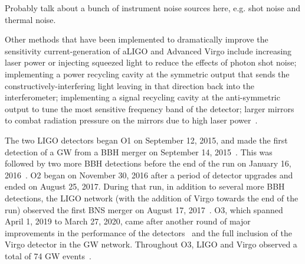 {\color{red}Probably talk about a bunch of instrument noise sources here, e.g. shot noise and thermal noise.}

Other methods that have been implemented to dramatically improve the sensitivity current-generation of \ac{aLIGO} and Advanced Virgo include increasing laser power or injecting squeezed light to reduce the effects of photon shot noise; implementing a power recycling cavity at the symmetric output that sends the constructively-interfering light leaving in that direction back into the interferometer; implementing a signal recycling cavity at the anti-symmetric output to tune the most sensitive frequency band of the detector; larger mirrors to combat radiation pressure on the mirrors due to high laser power~\citep{Creighton_2011}.

The two \ac{LIGO} detectors began \ac{O1} on September 12, 2015, and made the first detection of a \ac{GW} from a \ac{BBH} merger on September 14, 2015~\citep{gw150914}.
This was followed by two more \ac{BBH} detections before the end of the run on January 16, 2016~\citep{gwtc1}.
\Ac{O2} began on November 30, 2016 after a period of detector upgrades and ended on August 25, 2017.
During that run, in addition to several more \ac{BBH} detections, the \ac{LIGO} network (with the addition of Virgo towards the end of the run) observed the first \ac{BNS} merger on August 17, 2017~\citep{gw170817}.
\Ac{O3}, which spanned April 1, 2019 to March 27, 2020, came after another round of major improvements in the performance of the detectors~\citep{Buikema_2020} and the full inclusion of the Virgo detector in the \ac{GW} network.
Throughout \ac{O3}, \ac{LIGO} and Virgo observed a total of 74 \ac{GW} events~\citep{gwtc2,gwtc3}.
